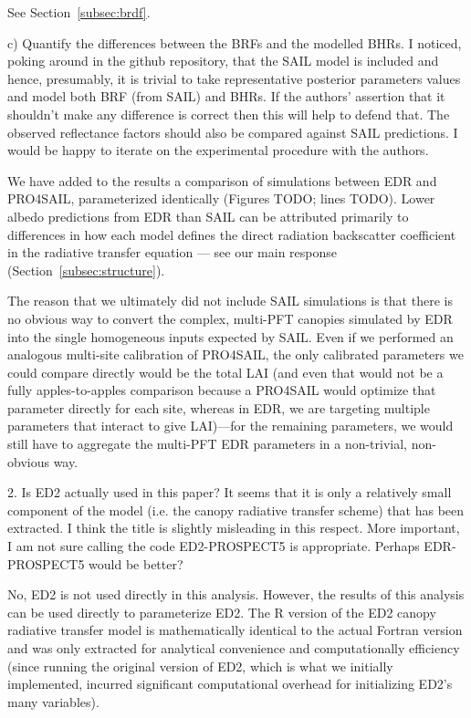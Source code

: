 See Section~\ref{subsec:brdf}.

\begin{reviewer}
  c) Quantify the differences between the BRFs and the modelled BHRs.
  I noticed, poking around in the github repository, that the SAIL model is included and hence, presumably, it is trivial to take representative posterior parameters values and model both BRF (from SAIL) and BHRs.
  If the authors’ assertion that it shouldn’t make any difference is correct then this will help to defend that.
  The observed reflectance factors should also be compared against SAIL predictions.
  I would be happy to iterate on the experimental procedure with the authors.
\end{reviewer}

We have added to the results a comparison of simulations between EDR and PRO4SAIL, parameterized identically (Figures TODO; lines TODO).
Lower albedo predictions from EDR than SAIL can be attributed primarily to differences in how each model defines the direct radiation backscatter coefficient in the radiative transfer equation --- see our main response (Section~\ref{subsec:structure}).

The reason that we ultimately did not include SAIL simulations is that there is no obvious way to convert the complex, multi-PFT canopies simulated by EDR into the single homogeneous inputs expected by SAIL.\@
Even if we performed an analogous multi-site calibration of PRO4SAIL, the only calibrated parameters we could compare directly would be the total LAI
(and even that would not be a fully apples-to-apples comparison because a PRO4SAIL would optimize that parameter directly for each site, whereas in EDR, we are targeting multiple parameters that interact to give LAI)---for the remaining parameters, we would still have to aggregate the multi-PFT EDR parameters in a non-trivial, non-obvious way.

\begin{reviewer}
  2. Is ED2 actually used in this paper? It seems that it is only a relatively small component of the model (i.e. the canopy radiative transfer scheme) that has been extracted. I think the title is slightly misleading in this respect. More important, I am not sure calling the code ED2-PROSPECT5 is appropriate. Perhaps EDR-PROSPECT5 would be better?
\end{reviewer}

No, ED2 is not used directly in this analysis.
However, the results of this analysis can be used directly to parameterize ED2.
The R version of the ED2 canopy radiative transfer model is mathematically identical to the actual Fortran version and was only extracted for analytical convenience and computationally efficiency
(since running the original version of ED2, which is what we initially implemented, incurred significant computational overhead for initializing ED2’s many variables).

